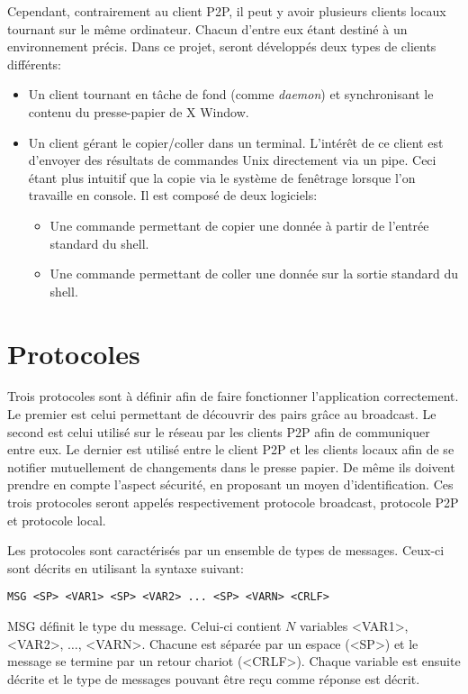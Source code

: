 Cependant, contrairement au client P2P, il peut y avoir plusieurs clients
locaux tournant sur le même ordinateur. Chacun d'entre eux étant destiné
à un environnement précis. Dans ce projet, seront développés deux types
de clients différents:
\begin{itemize}
\item Un client tournant en tâche de fond (comme \emph{daemon}) et
  synchronisant le contenu du presse-papier de X Window.
\item Un client gérant le copier/coller dans un terminal. L'intérêt de ce
  client est d'envoyer des résultats de commandes Unix directement via
  un pipe. Ceci étant plus intuitif que la copie via le système de fenêtrage
  lorsque l'on travaille en console.
  Il est composé de deux logiciels:
  \begin{itemize}
  \item Une commande permettant de copier une donnée à partir de l'entrée
    standard du shell.
  \item Une commande permettant de coller une donnée sur la sortie standard
    du shell.
  \end{itemize}
\end{itemize}

\section{Protocoles}
Trois protocoles sont à définir afin de faire fonctionner l'application
correctement. Le premier est celui permettant de découvrir des pairs grâce au
broadcast. Le second est celui utilisé sur le réseau par les clients
P2P afin de communiquer entre eux. Le dernier est utilisé entre le client
P2P et les clients locaux afin de se notifier mutuellement de changements
dans le presse papier. De même ils doivent prendre en compte
l'aspect sécurité, en proposant un moyen d'identification.
Ces trois protocoles seront appelés respectivement protocole broadcast,
protocole P2P et protocole local.

Les protocoles sont caractérisés par un ensemble de types de messages.
Ceux-ci sont décrits en utilisant la syntaxe suivant:
\begin{verbatim}
MSG <SP> <VAR1> <SP> <VAR2> ... <SP> <VARN> <CRLF>
\end{verbatim}
MSG définit le type du message. Celui-ci contient $N$ variables
<VAR1>, <VAR2>, $\ldots$, <VARN>. Chacune est séparée par un espace (<SP>)
et le message se termine par un retour chariot (<CRLF>). Chaque variable est
ensuite décrite et le type de messages pouvant être reçu comme réponse est
décrit.

